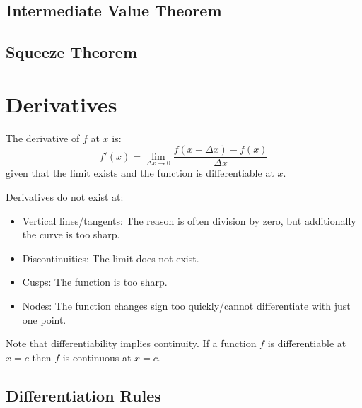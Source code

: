 \documentclass{article}
\begin{document}
\subsection{Intermediate Value Theorem}


\subsection{Squeeze Theorem}

\section{Derivatives}

\begin{definition}\label{def:derivative}
    The derivative of $f$ at $x$ is:
    \begin{equation*}
        f'(x) = \lim_{\Delta x \to 0} \frac{f(x + \Delta x) - f(x)}{\Delta x}
    \end{equation*}
    given that the limit exists and the function is differentiable at $x$.
\end{definition}

Derivatives do not exist at:

\begin{itemize}
    \item Vertical lines/tangents: The reason is often division by zero, but additionally the curve is too sharp.
    \item Discontinuities: The limit does not exist.
    \item Cusps: The function is too sharp.
    \item Nodes: The function changes sign too quickly/cannot differentiate with just one point.
\end{itemize}

Note that differentiability implies continuity. If a function
$f$ is differentiable at $x = c$ then $f$ is continuous at $x = c$.

\subsection{Differentiation Rules}

\end{document}
